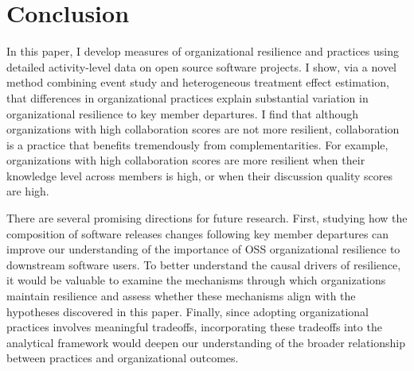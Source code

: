 \documentclass[12pt,notitlepage]{article}
\begin{document}
\newpage


\section{Conclusion} \label{sec:conclusion}
In this paper, I develop measures of organizational resilience and practices using detailed activity-level data on open source software projects.
I show, via a novel method combining event study and heterogeneous treatment effect estimation, that differences in organizational practices explain substantial variation in organizational resilience to key member departures. 
I find that although organizations with high collaboration scores are not more resilient, collaboration is a practice that benefits tremendously from complementarities.
For example, organizations with high collaboration scores are more resilient when their knowledge level across members is high, or when their discussion quality scores are high. 

There are several promising directions for future research. 
First, studying how the composition of software releases changes following key member departures can improve our understanding of the importance of OSS organizational resilience to downstream software users. 
To better understand the causal drivers of resilience, it would be valuable to examine the mechanisms through which organizations maintain resilience and assess whether these mechanisms align with the hypotheses discovered in this paper.
Finally, since adopting organizational practices involves meaningful tradeoffs, incorporating these tradeoffs into the analytical framework would deepen our understanding of the broader relationship between practices and organizational outcomes.

\newpage





\newpage








\newpage

\clearpage


\end{document}
